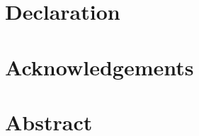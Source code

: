 \documentclass[12pt,oneside]{report}
\begin{document}
\chapter*{Declaration}

\chapter*{Acknowledgements}

\chapter*{Abstract}

\tableofcontents
\clearpage
\listoffigures
\clearpage
\listoftables
\clearpage
{}

\end{document}

